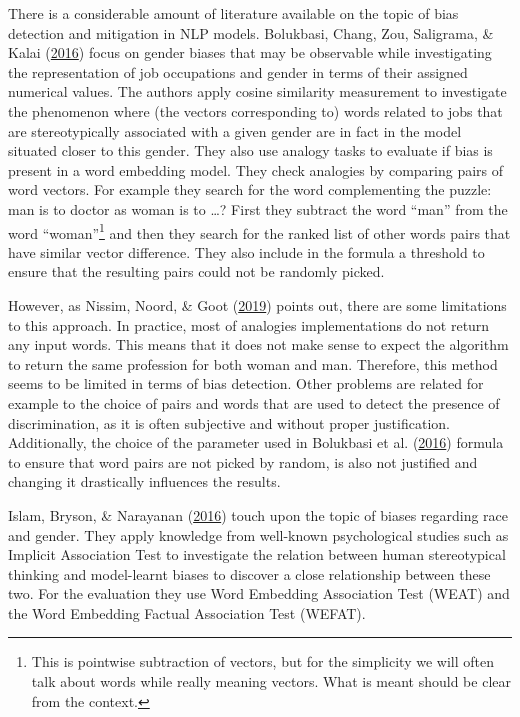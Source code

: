 \documentclass[12pt,]{book}
\begin{document}
There is a considerable amount of literature available on the topic of
bias detection and mitigation in NLP models. Bolukbasi, Chang, Zou,
Saligrama, \& Kalai (\protect\hyperlink{ref-Bolukbasi2016Man}{2016})
focus on gender biases that may be observable while investigating the
representation of job occupations and gender in terms of their assigned
numerical values. The authors apply cosine similarity measurement to
investigate the phenomenon where (the vectors corresponding to) words
related to jobs that are stereotypically associated with a given gender
are in fact in the model situated closer to this gender. They also use
analogy tasks to evaluate if bias is present in a word embedding model.
They check analogies by comparing pairs of word vectors. For example
they search for the word complementing the puzzle: man is to doctor as
woman is to \ldots{}? First they subtract the word ``man'' from the word
``woman''\footnote{This is pointwise subtraction of vectors, but for the
  simplicity we will often talk about words while really meaning
  vectors. What is meant should be clear from the context.} and then
they search for the ranked list of other words pairs that have similar
vector difference. They also include in the formula a threshold to
ensure that the resulting pairs could not be randomly picked.

However, as Nissim, Noord, \& Goot
(\protect\hyperlink{ref-Nissim2019Fair}{2019}) points out, there are
some limitations to this approach. In practice, most of analogies
implementations do not return any input words. This means that it does
not make sense to expect the algorithm to return the same profession for
both woman and man. Therefore, this method seems to be limited in terms
of bias detection. Other problems are related for example to the choice
of pairs and words that are used to detect the presence of
discrimination, as it is often subjective and without proper
justification. Additionally, the choice of the parameter used in
Bolukbasi et al. (\protect\hyperlink{ref-Bolukbasi2016Man}{2016})
formula to ensure that word pairs are not picked by random, is also not
justified and changing it drastically influences the results.

Islam, Bryson, \& Narayanan
(\protect\hyperlink{ref-Caliskan2017Semantics}{2016}) touch upon the
topic of biases regarding race and gender. They apply knowledge from
well-known psychological studies such as Implicit Association Test to
investigate the relation between human stereotypical thinking and
model-learnt biases to discover a close relationship between these two.
For the evaluation they use Word Embedding Association Test (WEAT) and
the Word Embedding Factual Association Test (WEFAT).
\end{document}
